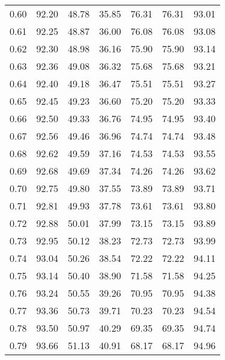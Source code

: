 \begin{tabular}{|c|c|c|c|c|c|c|}
      0.60 &     92.20 &     48.78 &      35.85 &   76.31 &      76.31 &         93.01 \\
      0.61 &     92.25 &     48.87 &      36.00 &   76.08 &      76.08 &         93.08 \\
      0.62 &     92.30 &     48.98 &      36.16 &   75.90 &      75.90 &         93.14 \\
      0.63 &     92.36 &     49.08 &      36.32 &   75.68 &      75.68 &         93.21 \\
      0.64 &     92.40 &     49.18 &      36.47 &   75.51 &      75.51 &         93.27 \\
      0.65 &     92.45 &     49.23 &      36.60 &   75.20 &      75.20 &         93.33 \\
      0.66 &     92.50 &     49.33 &      36.76 &   74.95 &      74.95 &         93.40 \\
      0.67 &     92.56 &     49.46 &      36.96 &   74.74 &      74.74 &         93.48 \\
      0.68 &     92.62 &     49.59 &      37.16 &   74.53 &      74.53 &         93.55 \\
      0.69 &     92.68 &     49.69 &      37.34 &   74.26 &      74.26 &         93.62 \\
      0.70 &     92.75 &     49.80 &      37.55 &   73.89 &      73.89 &         93.71 \\
      0.71 &     92.81 &     49.93 &      37.78 &   73.61 &      73.61 &         93.80 \\
      0.72 &     92.88 &     50.01 &      37.99 &   73.15 &      73.15 &         93.89 \\
      0.73 &     92.95 &     50.12 &      38.23 &   72.73 &      72.73 &         93.99 \\
      0.74 &     93.04 &     50.26 &      38.54 &   72.22 &      72.22 &         94.11 \\
      0.75 &     93.14 &     50.40 &      38.90 &   71.58 &      71.58 &         94.25 \\
      0.76 &     93.24 &     50.55 &      39.26 &   70.95 &      70.95 &         94.38 \\
      0.77 &     93.36 &     50.73 &      39.71 &   70.23 &      70.23 &         94.54 \\
      0.78 &     93.50 &     50.97 &      40.29 &   69.35 &      69.35 &         94.74 \\
      0.79 &     93.66 &     51.13 &      40.91 &   68.17 &      68.17 &         94.96 \\

\end{tabular}
